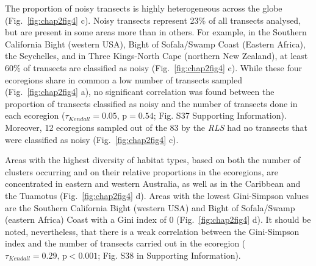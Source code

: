 \begin{refsection}
The proportion of noisy transects is highly heterogeneous across the
globe (Fig.~\ref{fig:chap2fig4} c). Noisy transects represent 23\% of
all transects analysed, but are present in some areas more than in
others. For example, in the Southern California Bight (western USA),
Bight of Sofala/Swamp Coast (Eastern Africa), the Seychelles, and in
Three Kings-North Cape (northern New Zealand), at least 60\% of
transects are classified as noisy (Fig.~\ref{fig:chap2fig4} c). While
these four ecoregions share in common a low number of transects sampled
(Fig.~\ref{fig:chap2fig4} a), no significant correlation was found
between the proportion of transects classified as noisy and the number
of transects done in each ecoregion
(\(\tau_{Kendall} = 0.05 \text{, p}= 0.54\); Fig. S37 Supporting
Information). Moreover, 12 ecoregions sampled out of the 83 by the
\emph{RLS} had no transects that were classified as noisy
(Fig.~\ref{fig:chap2fig4} c).

Areas with the highest diversity of habitat types, based on both the
number of clusters occurring and on their relative proportions in the
ecoregions, are concentrated in eastern and western Australia, as well
as in the Caribbean and the Tuamotus (Fig.~\ref{fig:chap2fig4} d). Areas
with the lowest Gini-Simpson values are the Southern California Bight
(western USA) and Bight of Sofala/Swamp (eastern Africa) Coast with a
Gini index of 0 (Fig.~\ref{fig:chap2fig4} d). It should be noted,
nevertheless, that there is a weak correlation between the Gini-Simpson
index and the number of transects carried out in the ecoregion
(\(\tau_{Kendall} = 0.29 \text{, p} < 0.001\); Fig. S38 in Supporting
Information).


\end{refsection}

